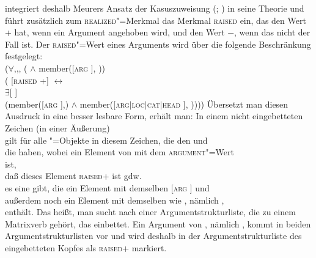 \citet{Prze99b} integriert deshalb Meurers Ansatz der Kasuszuweisung (\citeyear{Meurers99b}; \citeyear[Kapitel~10.4.1.4]{Meurers2000b})
in seine Theorie und führt zusätzlich zum \textsc{realized}"=Merkmal
das Merkmal \textsc{raised} ein, das den Wert + hat, wenn ein
Argument angehoben wird, und den Wert $-$, wenn das nicht der Fall ist.
Der \textsc{raised}"=Wert eines Arguments wird über die folgende Beschränkung
festgelegt:
\ea
\label{raised-wert}
 \impl\\
\mbox{}\hspace{3ex}($\forall$,,, (  $\wedge$ member([\textsc{arg}  ], )) \impl\\
\mbox{}\hspace{6ex}( [\textsc{raised} +] $\leftrightarrow$\\
\mbox{}\hspace{9ex}$\exists$[\argst {} ]\\
\mbox{}\hspace{9ex}(member([\textsc{arg}  ],) $\wedge$ member([\textsc{arg$|$loc$|$cat$|$head}  ], ))))
\z
Übersetzt man diesen Ausdruck in eine besser lesbare Form, erhält man:
\ea
In einem nicht eingebetteten Zeichen (\dash in einer Äußerung)\\
\mbox{}\hspace{3ex}gilt für alle "=Objekte in diesem Zeichen, die den \headw {} und\\
\mbox{}\hspace{3ex}die \argst {} haben, wobei  ein Element von  mit dem
     \textsc{argument}"=Wert \\
\mbox{}\hspace{3ex}ist,\\
\mbox{}\hspace{3ex}daß dieses Element  \textsc{raised}+ ist gdw.\ \\
\mbox{}\hspace{6ex}es eine \argstl gibt, die ein Element mit demselben [\textsc{arg}  ] und\\
\mbox{}\hspace{6ex}außerdem noch ein Element mit demselben \headw wie , nämlich ,\\
\mbox{}\hspace{6ex}enthält.
\z
Das heißt, man sucht nach einer Argumentstrukturliste, die zu einem Matrixverb gehört, das
 einbettet. Ein Argument von , nämlich , kommt in beiden Argumentstrukturlisten
vor und wird deshalb in der Argumentstrukturliste des eingebetteten Kopfes als \textsc{raised}+ markiert.

